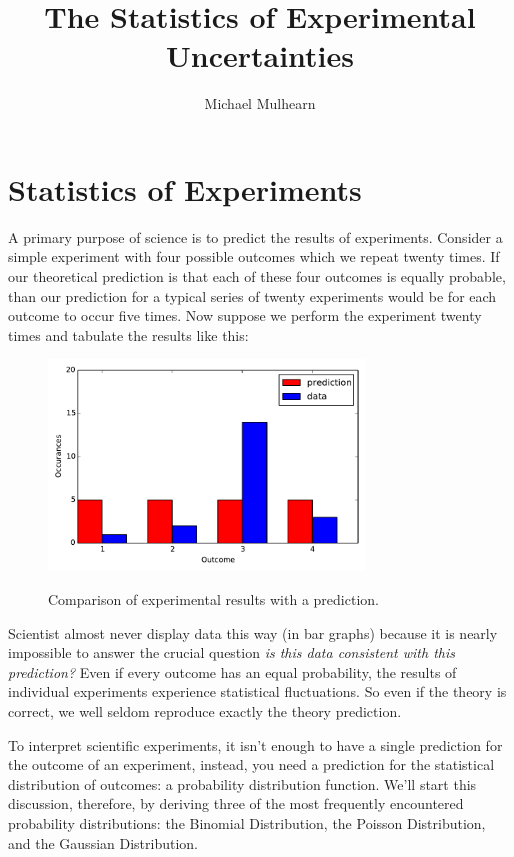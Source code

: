 \documentclass[12pt]{article}
\begin{document}
\title{The Statistics of Experimental Uncertainties}
\author{Michael Mulhearn}

\maketitle

\section{Statistics of Experiments}

A primary purpose of science is to predict the results of experiments.  Consider a simple experiment with four possible outcomes which we repeat twenty times.  If our theoretical prediction is that each of these four outcomes is equally probable, than our prediction for a typical series of twenty experiments would be for each outcome to occur five times.  Now suppose we perform the experiment twenty times and tabulate the results like this:

\begin{figure}[htbp]
\begin{center}
{\includegraphics[width=0.75\textwidth]{figs/pred.pdf}}
\end{center}
\caption{\label{fig:hist} Comparison of experimental results with a prediction.}
\end{figure}

Scientist almost never display data this way (in bar graphs) because it is nearly impossible to answer the crucial question {\em is this data consistent with this prediction?}  Even if every outcome has an equal probability, the results of individual experiments experience statistical fluctuations.  So even if the theory is correct, we well seldom reproduce exactly the theory prediction.

To interpret scientific experiments, it isn't enough to have a single prediction for the outcome of an experiment, instead, you need a prediction for the statistical distribution of outcomes: a probability distribution function.  We'll start this discussion, therefore, by deriving three of the most frequently encountered probability distributions:  the Binomial Distribution, the Poisson Distribution, and the Gaussian Distribution.
\end{document}
